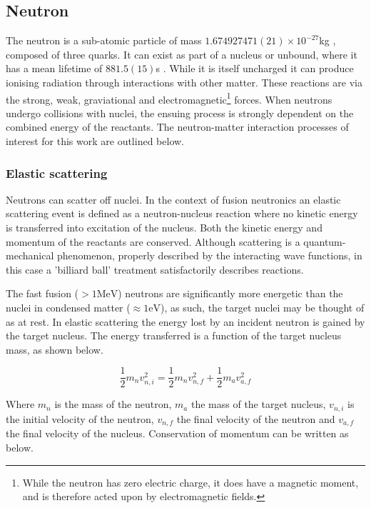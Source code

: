 \subsection{Neutron}
The neutron is a sub-atomic particle of mass $1.674927471(21)\times10^{-27}$kg \cite{}, composed of three quarks. It can exist as part of a nucleus or unbound, where it has a mean lifetime of $881.5(15)$s \cite{}. While it is itself uncharged it can produce ionising radiation through interactions with other matter. These reactions are via the strong, weak, graviational and electromagnetic\footnote{While the neutron has zero electric charge, it does have a magnetic moment, and is therefore acted upon by electromagnetic fields.} forces. When neutrons undergo collisions with nuclei, the ensuing process is strongly dependent on the combined energy of the reactants. The neutron-matter interaction processes of interest for this work are outlined below.

\subsubsection{Elastic scattering}
Neutrons can scatter off nuclei. In the context of fusion neutronics an elastic scattering event is defined as a neutron-nucleus reaction where no kinetic energy is transferred into excitation of the nucleus. Both the kinetic energy and momentum of the reactants are conserved. Although scattering is a quantum-mechanical phenomenon, properly described by the interacting wave functions, in this case a 'billiard ball' treatment satisfactorily describes reactions. 

The fast fusion ($> 1 \mathrm{MeV}$) neutrons are significantly more energetic than the nuclei in condensed matter ($\approx 1 \mathrm{eV}$), as such, the target nuclei may be thought of as at rest. In elastic scattering the energy lost by an incident neutron is gained by the target nucleus. The energy transferred is a function of the target nucleus mass, as shown below.

\begin{equation}
  \frac{1}{2}m_{n}v_{n,i}^{2} = \frac{1}{2}m_{n}v_{n,f}^{2} + \frac{1}{2}m_{a}v_{a,f}^{2}
  \label{eq:conserve_energy}
\end{equation}

Where $m_{n}$ is the mass of the neutron, $m_{a}$ the mass of the target nucleus, $v_{n,i}$ is the initial velocity of the neutron, $v_{n,f}$ the final velocity of the neutron and $v_{a,f}$ the final velocity of the nucleus. Conservation of momentum can be written as below.

